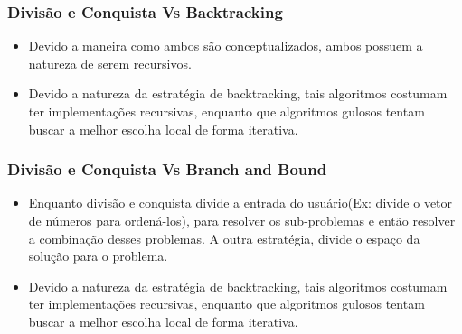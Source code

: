       \subsubsection{Divisão e Conquista Vs Backtracking}

      \begin{itemize}
          \item Devido a maneira como ambos são conceptualizados, ambos 
          possuem a natureza de serem recursivos.
          \item Devido a natureza da estratégia de backtracking, tais algoritmos costumam ter 
          implementações recursivas, enquanto que algoritmos gulosos tentam 
          buscar a melhor escolha local de forma iterativa.
      \end{itemize}

      \subsubsection{Divisão e Conquista Vs Branch and Bound}

      \begin{itemize}
          \item Enquanto divisão e conquista divide a entrada do usuário(Ex: divide o vetor de números para 
          ordená-los), para resolver os sub-problemas e então resolver a combinação desses problemas. A outra estratégia, 
          divide o espaço da solução para o problema.
          \item Devido a natureza da estratégia de backtracking, tais algoritmos costumam ter 
          implementações recursivas, enquanto que algoritmos gulosos tentam 
          buscar a melhor escolha local de forma iterativa.
      \end{itemize}

\newpage